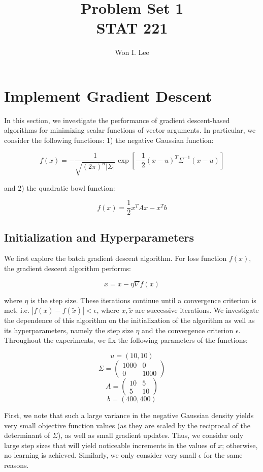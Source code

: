 \documentclass[psamsfonts]{amsart}
\title{Problem Set 1 \\ STAT 221}
\author{Won I. Lee}
\theoremstyle{definition}
\theoremstyle{remark}
\numberwithin{equation}{section}
\begin{document}
	
\maketitle

\section{Implement Gradient Descent}

In this section, we investigate the performance of gradient descent-based algorithms for minimizing scalar functions of vector arguments. In particular, we consider the following functions: 1) the negative Gaussian function:

$$f(x) = -\frac{1}{\sqrt{(2\pi)^n |\Sigma|}} \exp\left[ -\frac{1}{2}(x-u)^T\Sigma^{-1}(x-u) \right]$$

and 2) the quadratic bowl function:

$$f(x) = \frac{1}{2}x^TAx - x^Tb$$

\subsection{Initialization and Hyperparameters} We first explore the batch gradient descent algorithm. For loss function $f(x)$, the gradient descent algorithm performs:

$$x = x - \eta \nabla f(x)$$

where $\eta$ is the step size. These iterations continue until a convergence criterion is met, i.e. $|f(x) - f(\tilde{x})| < \epsilon$, where $x, \tilde{x}$ are successive iterations. We investigate the dependence of this algorithm on the initialization of the algorithm as well as its hyperparameters, namely the step size $\eta$ and the convergence criterion $\epsilon$. Throughout the experiments, we fix the following parameters of the functions:

$$u = (10, 10)$$
$$\Sigma = \begin{pmatrix} 1000 & 0 \\ 0 & 1000\end{pmatrix}$$
$$A = \begin{pmatrix} 10 & 5 \\ 5 & 10\end{pmatrix}$$
$$b = (400, 400)$$

First, we note that such a large variance in the negative Gaussian density yields very small objective function values (as they are scaled by the reciprocal of the determinant of $\Sigma$), as well as small gradient updates. Thus, we consider only large step sizes that will yield noticeable increments in the values of $x$; otherwise, no learning is achieved. Similarly, we only consider very small $\epsilon$ for the same reasons.
\end{document}

